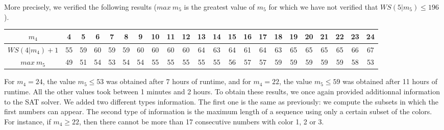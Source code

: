 More precisely, we verified the following results (\(max~m_5\) is the greatest value of \(m_5\) for which we have not
verified that \(WS(5 | m_5) \leq 196\)).

\renewcommand{\arraystretch}{1.5}
\setlength{\tabcolsep}{3pt}

\begin{center}
\begin{tabular}{| c | *{21}{c |}}
	\hline
	\(m_4\) & 4 & 5 & 6 & 7 & 8 & 9 & 10 & 11 & 12 & 13 & 14 & 15 & 16 & 17 & 18 & 19 & 20 & 21 & 22 & 23 & 24 \\
	\hline
	\(WS(4 | m_4) + 1\) & 55 & 59 & 60 & 59 & 59 & 60 & 60 & 60 & 60 & 64 & 63 & 64 & 61 & 64 & 63 & 65 & 65 & 65 & 65 & 66
	& 67 \\
	\hline
	\(max~m_5\) & 49 & 51 & 54 & 53 & 54 & 54 & 55 & 55 & 55 & 55 & 55 & 56 & 57 & 57 & 59 & 59 & 59 & 59 & 59 & 58 & 53 \\
	\hline
\end{tabular}
\end{center}

For \(m_4 = 24\), the value \(m_5 \leqslant 53\) was obtained after 7 hours of runtime, and for  \(m_4 = 22\), the 
value \(m_5 \leqslant 59\) was obtained after 11 hours of runtime. All the other values took between 1 minutes and 2 hours.
To obtain these results, we once again provided additionnal information to the SAT solver. We added two different types information. 
The first one is the same as previously: we compute the subsets in which the first numbers can appear. The second type of 
information is the maximum length of a sequence using only a certain subset of the colors. For instance, 
if \(m_4 \geqslant 22\), then there cannot be more than 17 consecutive numbers with color 1, 2 or 3. \\
